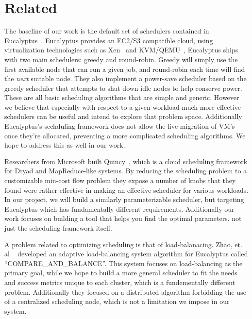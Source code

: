 \section{Related}



The baseline of our work is the default set of schedulers contained in
Eucalyptus~\cite{Eucalyptus}.  Eucalyptus provides an EC2/S3%
compatible cloud, using virtualization technologies such as Xen~\cite{Xen} and
KVM/QEMU~\cite{QEMU}, Eucalyptus ships with two main schedulers: greedy and
round-robin.  Greedy will simply use the first available node that can run a
given job, and round-robin each time will find the \emph{next} suitable node.
They also implement a power-save scheduler based on the greedy scheduler that
attempts to shut down idle nodes to help conserve power.  These are all basic
scheduling algorithms that are simple and generic.  However we believe that
especially with respect to a given workload much more effective schedulers can
be useful and intend to explore that problem space.  Additionally Eucalyptus's
sechduling framework does not allow the live migration of VM's once they're
allocated, preventing a more complicated scheduling algorithms.  We hope to
address this as well in our work.

Researchers from Microsoft built Quincy~\cite{Quincy}, which is a cloud
scheduling framework for Dryad and MapReduce-like systems.  By reducing the
scheduling problem to a customizable min-cost flow problem they expose a number
of knobs that they found were rather effective in making an effective scheduler
for various workloads.  In our project, we will build a similarly
parameterizable scheduler, but targeting Eucalyptus which has fundamentally
different requirements.  Additionally our work focuses on building a tool that
helps you find the optimal parameters, not just the scheduling framework itself.


A problem related to optimizing scheduling is that of load-balanacing.  Zhao,
et. al ~\cite{Zhao} developed an adaptive load-balancing system algorithm for
Eucalyptus called ``COMPARE\_AND\_BALANCE''.  This system focuses on
load-balancing as the primary goal, while we hope to build a more general
scheduler to fit the needs and success metrics unique to each cluster, which is
a fundementally different problem.  Additionally they focused on a distributed
algorithm forbidding the use of a centralized scheduling node, which is not a
limitation we impose in our system.



